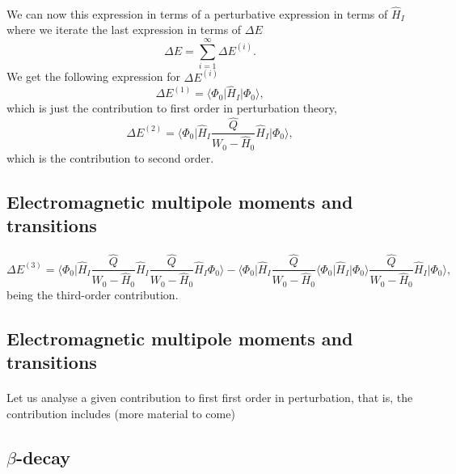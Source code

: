 \documentclass[%
twoside,                 %
final,                   %
10pt]{article}
\begin{document}
\paragraph{}
We can now this expression in terms of a perturbative expression in terms
of $\hat{H}_I$ where we iterate the last expression in terms of $\Delta E$
\[
\Delta E=\sum_{i=1}^{\infty}\Delta E^{(i)}.
\]
We get the following expression for $\Delta E^{(i)}$
\[
\Delta E^{(1)}=\langle \Phi_0\vert \hat{H}_I\vert \Phi_0\rangle,
\] 
which is just the contribution to first order in perturbation theory,
\[
\Delta E^{(2)}=\langle\Phi_0\vert \hat{H}_I\frac{\hat{Q}}{W_0-\hat{H}_0}\hat{H}_I\vert \Phi_0\rangle, 
\]
which is the contribution to second order.



\subsection*{Electromagnetic multipole moments and transitions}

\paragraph{}
\[
\Delta E^{(3)}=\langle \Phi_0\vert \hat{H}_I\frac{\hat{Q}}{W_0-\hat{H}_0}\hat{H}_I\frac{\hat{Q}}{W_0-\hat{H}_0}\hat{H}_I\Phi_0\rangle-
\langle\Phi_0\vert \hat{H}_I\frac{\hat{Q}}{W_0-\hat{H}_0}\langle \Phi_0\vert \hat{H}_I\vert \Phi_0\rangle\frac{\hat{Q}}{W_0-\hat{H}_0}\hat{H}_I\vert \Phi_0\rangle,
\]
being the third-order contribution.



\subsection*{Electromagnetic multipole moments and transitions}

\paragraph{}
Let us analyse a given contribution to first first order in perturbation, that is, the contribution includes (more material to come)



\subsection*{$\beta$-decay}
\end{document}
